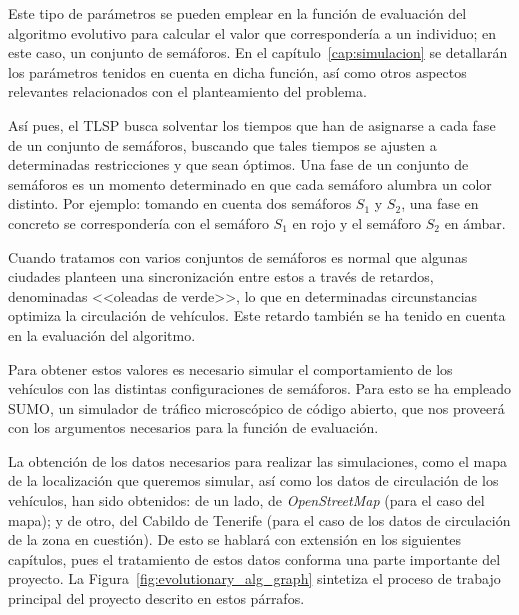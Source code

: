 Este tipo de parámetros se pueden emplear en la función de evaluación del algoritmo evolutivo para calcular el valor que correspondería a un individuo; en este caso, un conjunto de semáforos. En el capítulo~\ref{cap:simulacion} se detallarán los parámetros tenidos en cuenta en dicha función, así como otros aspectos relevantes relacionados con el planteamiento del problema.

Así pues, el TLSP busca solventar los tiempos que han de asignarse a cada fase de un conjunto de semáforos, buscando que tales tiempos se ajusten a determinadas restricciones y que sean óptimos. Una fase de un conjunto de semáforos es un momento determinado en que cada semáforo alumbra un color distinto. Por ejemplo: tomando en cuenta dos semáforos $S_1$ y $S_2$, una fase en concreto se correspondería con el semáforo $S_1$ en rojo y el semáforo $S_2$ en ámbar.

Cuando tratamos con varios conjuntos de semáforos es normal que algunas ciudades planteen una sincronización entre estos a través de retardos, denominadas <<oleadas de verde>>, lo que en determinadas circunstancias optimiza la circulación de vehículos. Este retardo también se ha tenido en cuenta en la evaluación del algoritmo.

Para obtener estos valores es necesario simular el comportamiento de los vehículos con las distintas configuraciones de semáforos. Para esto se ha empleado SUMO, un simulador de tráfico microscópico de código abierto, que nos proveerá con los argumentos necesarios para la función de evaluación.

La obtención de los datos necesarios para realizar las simulaciones, como el mapa de la localización que queremos simular, así como los datos de circulación de los vehículos, han sido obtenidos: de un lado, de \textit{OpenStreetMap} (para el caso del mapa); y de otro, del Cabildo de Tenerife (para el caso de los datos de circulación de la zona en cuestión). De esto se hablará con extensión en los siguientes capítulos, pues el tratamiento de estos datos conforma una parte importante del proyecto. La Figura~\ref{fig:evolutionary_alg_graph} sintetiza el proceso de trabajo principal del proyecto descrito en estos párrafos.

